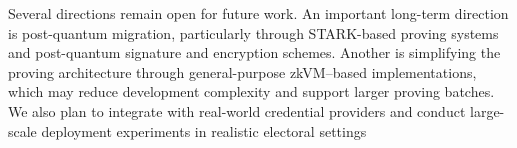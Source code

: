 
Several directions remain open for future work. An important long-term direction is post-quantum migration, particularly through STARK-based proving systems and post-quantum signature and encryption schemes. Another is simplifying the proving architecture through general-purpose zkVM–based implementations, which may reduce development complexity and support larger proving batches. We also plan to integrate with real-world credential providers and conduct large-scale deployment experiments in realistic electoral settings
